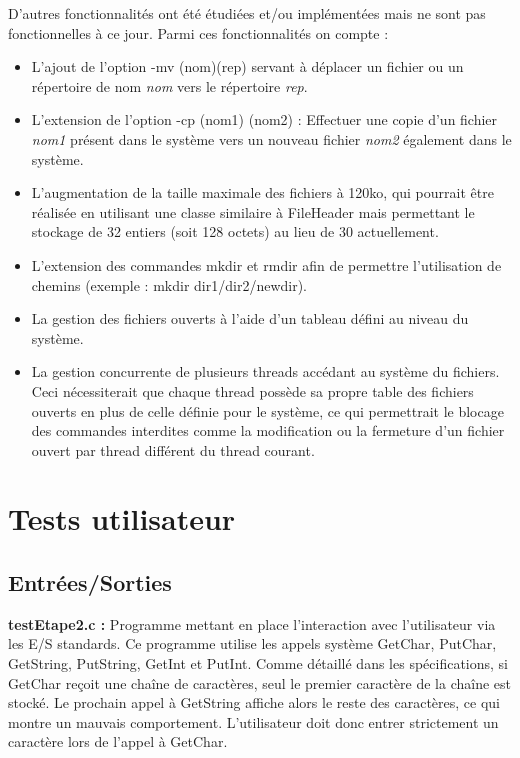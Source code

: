 \documentclass[12pt]{report}
\begin{document}
D'autres fonctionnalités ont été étudiées et/ou implémentées mais ne sont pas fonctionnelles à ce jour.
Parmi ces fonctionnalités on compte :
\begin{itemize}\renewcommand{\labelitemi}{$\bullet$}
\item L'ajout de l'option -mv (nom)(rep) servant à déplacer un fichier ou un répertoire de nom \textit{nom} vers le répertoire \textit{rep}.
\item L'extension de l'option -cp (nom1) (nom2) : Effectuer une copie d'un fichier \textit{nom1} présent dans le système vers un nouveau fichier \textit{nom2} également dans le système.
\item L'augmentation de la taille maximale des fichiers à 120ko, qui pourrait être réalisée en utilisant une classe similaire à FileHeader mais permettant le stockage de 32 entiers (soit 128 octets) au lieu de 30 actuellement.
\item L'extension des commandes mkdir et rmdir afin de permettre l'utilisation de chemins (exemple : mkdir dir1/dir2/newdir).
\item La gestion des fichiers ouverts à l'aide d'un tableau défini au niveau du système.
\item La gestion concurrente de plusieurs threads accédant au système du fichiers. Ceci nécessiterait que chaque thread possède sa propre table des fichiers ouverts en plus de celle définie pour le système, ce qui permettrait le blocage des commandes interdites comme la modification ou la fermeture d'un fichier ouvert par thread différent du thread courant.
\end{itemize}




\chapter{Tests utilisateur}

\section{Entrées/Sorties}

\textbf{testEtape2.c :} Programme mettant en place l'interaction avec l'utilisateur via les E/S standards. Ce programme utilise les appels système GetChar, PutChar, GetString, PutString, GetInt et PutInt. Comme détaillé dans les spécifications, si GetChar reçoit une chaîne de caractères, seul le premier caractère de la chaîne est stocké. Le prochain appel à GetString affiche alors le reste des caractères, ce qui montre un mauvais comportement. L'utilisateur doit donc entrer strictement un caractère lors de l'appel à GetChar.
\bigskip
\end{document}
